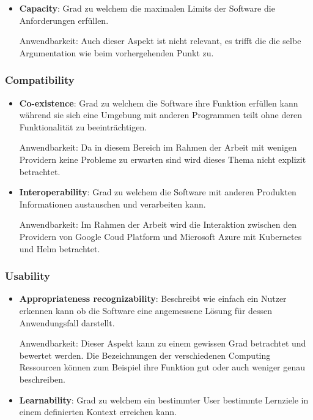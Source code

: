 \begin{spacing}{1.2}
\begin{itemize}
  \item \textbf{Capacity}: Grad zu welchem die maximalen Limits der
  Software die Anforderungen erfüllen.

  Anwendbarkeit: Auch dieser Aspekt ist nicht relevant, es trifft die
  die selbe Argumentation wie beim vorhergehenden Punkt zu.
\end{itemize}

\subsubsection{Compatibility}

\begin{itemize}
  \item \textbf{Co-existence}: Grad zu welchem die Software ihre Funktion
  erfüllen kann während sie sich eine Umgebung mit anderen Programmen
  teilt ohne deren Funktionalität zu beeinträchtigen.

  Anwendbarkeit: Da in diesem Bereich im Rahmen der Arbeit mit wenigen
  Providern keine Probleme zu erwarten sind wird dieses Thema nicht
  explizit betrachtet.

  \item \textbf{Interoperability}: Grad zu welchem die Software mit
  anderen Produkten Informationen austauschen und verarbeiten kann.

  Anwendbarkeit: Im Rahmen der Arbeit wird die Interaktion zwischen
  den Providern von Google Coud Platform und Microsoft Azure mit
  Kubernetes und Helm betrachtet.
\end{itemize}

\subsubsection{Usability}

\begin{itemize}
  \item \textbf{Appropriateness recognizability}: Beschreibt wie einfach
  ein Nutzer erkennen kann ob die Software eine angemessene Lösung für
  dessen Anwendungsfall darstellt.

  Anwendbarkeit: Dieser Aspekt kann zu einem gewissen Grad betrachtet
  und bewertet werden. Die Bezeichnungen der verschiedenen Computing 
  Ressourcen können zum Beispiel ihre Funktion gut oder auch weniger
  genau beschreiben.

  \item \textbf{Learnability}: Grad zu welchem ein bestimmter User
  bestimmte Lernziele in einem definierten Kontext erreichen kann.


\end{itemize}
\end{spacing}
